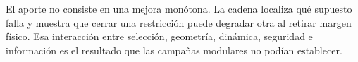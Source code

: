 El aporte no consiste en una mejora monótona. La cadena localiza qué supuesto falla y
muestra que cerrar una restricción puede degradar otra al retirar margen físico. Esa
interacción entre selección, geometría, dinámica, seguridad e información es el resultado
que las campañas modulares no podían establecer.
